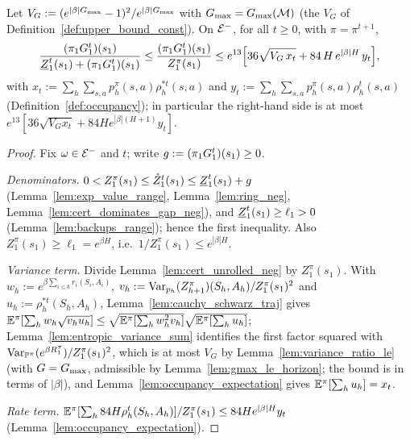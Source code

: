 \begin{lemma}\label{lem:ratio_bound_neg}
\leanok
{}
Let $V_G := (e^{|\beta|G_{\max}} - 1)^2/e^{|\beta|G_{\max}}$ with $G_{\max} = G_{\max}(\mathcal M)$ (the $V_G$ of
Definition~\ref{def:upper_bound_const}). On $\mathcal{E}^-$, for all $t \ge 0$, with $\pi = \pi^{t+1}$,
\[
  \frac{(\pi_1G_1^t)(s_1)}{\underline{Z}_1^t(s_1) + (\pi_1G_1^t)(s_1)}
  \le \frac{(\pi_1G_1^t)(s_1)}{Z^\pi_1(s_1)}
  \le e^{13}\Big[36\sqrt{V_G\,x_t} + 84\,H\,e^{|\beta|H}\,y_t\Big] ,
\]
with $x_t := \sum_{h}\sum_{s,a}p^\pi_h(s,a)\rho^{*t}_h(s,a)$ and $y_t := \sum_h\sum_{s,a}p^\pi_h(s,a)\rho^t_h(s,a)$
(Definition~\ref{def:occupancy}); in particular the right-hand side is at most
$e^{13}[36\sqrt{V_Gx_t} + 84He^{|\beta|(H+1)}y_t]$.
\end{lemma}

\begin{proof}
\leanok
Fix $\omega \in \mathcal{E}^-$ and $t$; write $g := (\pi_1G_1^t)(s_1) \ge 0$.

\emph{Denominators.} $0 < Z^\pi_1(s_1) \le \mathring{Z}_1^t(s_1) \le \underline{Z}_1^t(s_1) + g$ (Lemma~\ref{lem:exp_value_range},
Lemma~\ref{lem:ring_neg}, Lemma~\ref{lem:cert_dominates_gap_neg}), and $\underline{Z}_1^t(s_1) \ge \ell_1 > 0$
(Lemma~\ref{lem:backups_range}); hence the first inequality. Also $Z^\pi_1(s_1) \ge \ell_1 = e^{\beta H}$, i.e.\
$1/Z^\pi_1(s_1) \le e^{|\beta|H}$.

\emph{Variance term.} Divide Lemma~\ref{lem:cert_unrolled_neg} by $Z^\pi_1(s_1)$. With
$w_h := e^{\beta\sum_{i \le h}r_i(S_i,A_i)}$, $v_h := \operatorname{Var}_{p_h}(Z^\pi_{h+1})(S_h,A_h)/Z^\pi_1(s_1)^2$ and
$u_h := \rho^{*t}_h(S_h,A_h)$, Lemma~\ref{lem:cauchy_schwarz_traj} gives
$\mathbb{E}^\pi[\sum_hw_h\sqrt{v_hu_h}] \le \sqrt{\mathbb{E}^\pi[\sum_hw_h^2v_h]}\sqrt{\mathbb{E}^\pi[\sum_hu_h]}$;
Lemma~\ref{lem:entropic_variance_sum} identifies the first factor squared with
$\operatorname{Var}_{\mathbb{P}^\pi}(e^{\beta R_1^\pi})/Z^\pi_1(s_1)^2$, which is at most $V_G$ by Lemma~\ref{lem:variance_ratio_le}
(with $G = G_{\max}$, admissible by Lemma~\ref{lem:gmax_le_horizon}; the bound is in terms of $|\beta|$), and
Lemma~\ref{lem:occupancy_expectation} gives $\mathbb{E}^\pi[\sum_hu_h] = x_t$.

\emph{Rate term.} $\mathbb{E}^\pi[\sum_h 84H\rho^t_h(S_h,A_h)]/Z^\pi_1(s_1) \le 84He^{|\beta|H}y_t$
(Lemma~\ref{lem:occupancy_expectation}).
\end{proof}


